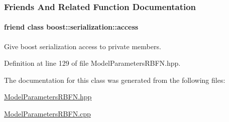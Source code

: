 \subsubsection{Friends And Related Function Documentation}
\hypertarget{classDmpBbo_1_1ModelParametersRBFN_ac98d07dd8f7b70e16ccb9a01abf56b9c}{
\paragraph[{boost\+::serialization\+::access}]{\setlength{\rightskip}{0pt plus 5cm}friend class boost\+::serialization\+::access\hspace{0.3cm}{\ttfamily [friend]}}}\label{classDmpBbo_1_1ModelParametersRBFN_ac98d07dd8f7b70e16ccb9a01abf56b9c}


Give boost serialization access to private members. 



Definition at line 129 of file Model\+Parameters\+R\+B\+F\+N.\+hpp.



The documentation for this class was generated from the following files\+:\begin{DoxyCompactItemize}
\item 
\hyperlink{ModelParametersRBFN_8hpp}{Model\+Parameters\+R\+B\+F\+N.\+hpp}\item 
\hyperlink{ModelParametersRBFN_8cpp}{Model\+Parameters\+R\+B\+F\+N.\+cpp}\end{DoxyCompactItemize}
